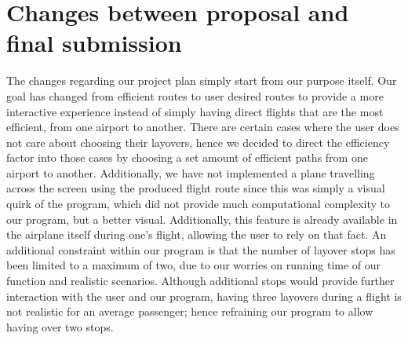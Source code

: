 \documentclass[fontsize=11pt]{article}
\begin{document}
\newpage
\section*{Changes between proposal and final submission}
The changes regarding our project plan simply start from our purpose itself. Our goal has changed from efficient routes to user desired routes to provide a more interactive experience instead of simply having direct flights that are the most efficient, from one airport to another. There are certain cases where the user does not care about choosing their layovers, hence we decided to direct the efficiency factor into those cases by choosing a set amount of efficient paths from one airport to another. Additionally, we have not implemented a plane travelling across the screen using the produced flight route since this was simply a visual quirk of the program, which did not provide much computational complexity to our program, but a better visual. Additionally, this feature is already available in the airplane itself during one’s flight, allowing the user to rely on that fact. An additional constraint within our program is that the number of layover stops has been limited to a maximum of two, due to our worries on running time of our function and realistic scenarios. Although additional stops would provide further interaction with the user and our program, having three layovers during a flight is not realistic for an average passenger; hence refraining our program to allow having over two stops. \\
\end{document}

